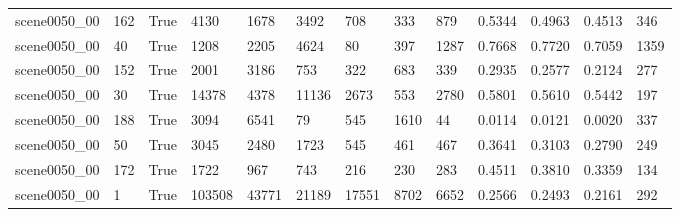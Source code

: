 \begin{tabular}{lllllllllllll}
scene0050\_00 & 162 & True & 4130 & 1678 & 3492 & 708 & 333 & 879 & 0.5344 & 0.4963 & 0.4513 & 346 \\
scene0050\_00 & 40 & True & 1208 & 2205 & 4624 & 80 & 397 & 1287 & 0.7668 & 0.7720 & 0.7059 & 1359 \\
scene0050\_00 & 152 & True & 2001 & 3186 & 753 & 322 & 683 & 339 & 0.2935 & 0.2577 & 0.2124 & 277 \\
scene0050\_00 & 30 & True & 14378 & 4378 & 11136 & 2673 & 553 & 2780 & 0.5801 & 0.5610 & 0.5442 & 197 \\
scene0050\_00 & 188 & True & 3094 & 6541 & 79 & 545 & 1610 & 44 & 0.0114 & 0.0121 & 0.0020 & 337 \\
scene0050\_00 & 50 & True & 3045 & 2480 & 1723 & 545 & 461 & 467 & 0.3641 & 0.3103 & 0.2790 & 249 \\
scene0050\_00 & 172 & True & 1722 & 967 & 743 & 216 & 230 & 283 & 0.4511 & 0.3810 & 0.3359 & 134 \\
scene0050\_00 & 1 & True & 103508 & 43771 & 21189 & 17551 & 8702 & 6652 & 0.2566 & 0.2493 & 0.2161 & 292 \\
\bottomrule
\end{tabular}
